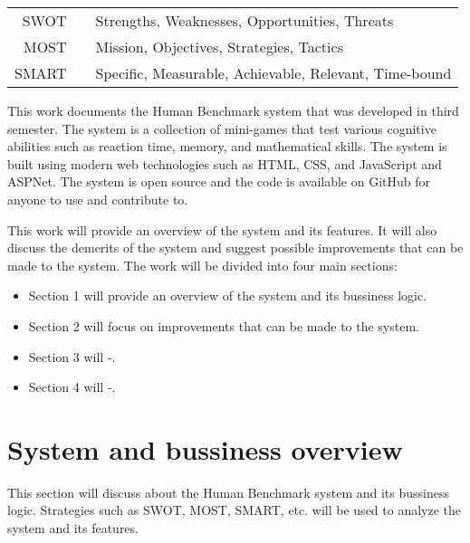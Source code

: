 \documentclass[]{VUMIFTemplateClass}
\begin{document}
\begin{tabular}{rcp{}}
    {SWOT} & {} & {Strengths, Weaknesses, Opportunities, Threats} \\
    {MOST} & {} & {Mission, Objectives, Strategies, Tactics} \\
    {SMART} & {} & {Specific, Measurable, Achievable, Relevant, Time-bound} \\
\end{tabular}

This work documents the Human Benchmark system that was developed in third semester. The system is a collection of mini-games that test various cognitive abilities such as reaction time, 
memory, and mathematical skills. The system is built using modern web technologies such as HTML, CSS, and JavaScript and ASPNet. The system is open source and the code is available on GitHub 
for anyone to use and contribute to.

This work will provide an overview of the system and its features. It will also discuss the demerits of the system and suggest possible improvements that can be made to the system.
The work will be divided into four main sections: 
\begin{itemize}
    \item Section 1 will provide an overview of the system and its bussiness logic.
    \item Section 2 will focus on improvements that can be made to the system.
    \item Section 3 will -.
    \item Section 4 will -.
\end{itemize}


\section{System and bussiness overview}

This section will discuss about the Human Benchmark system and its bussiness logic. Strategies such as SWOT, MOST, SMART, etc. will be used to analyze the system and its features.
\end{document}

